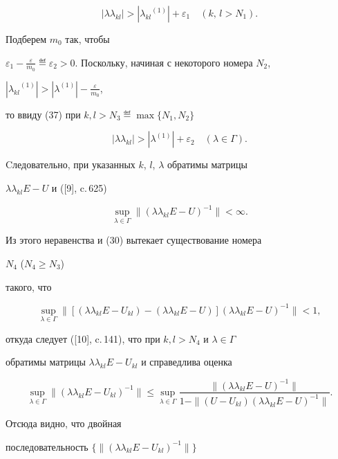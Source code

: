 \begin{pf}
\begin{equation}
|\lambda\lambda_{kl}|>|{\lambda_{kl}}^{(1)}|+{\varepsilon}_1


\quad (k,\,l>N_1).


\end{equation}


Подберем $m_0$ так, чтобы


${\varepsilon}_1-\frac{\varepsilon}{m_0}\eqdef 


{\varepsilon}_2>0$. Поскольку, начиная с некоторого номера $N_2$,


$|{\lambda_{kl}}^{(1)}|>|\lambda^{(1)}|-{\frac{{\varepsilon}}{m_0}}$,


то ввиду (37) при $k,l>N_3\eqdef \max\{N_1,N_2\}$


$$


|\lambda\lambda_{kl}|>|\lambda^{(1)}|+{\varepsilon}_2\quad (\lambda\in\Gamma).


$$


Cледовательно, при указанных $k$, $l$, $\lambda$ обратимы матрицы


$\lambda\lambda_{kl}E-U$ и ([9], c.\,625)


$$


\sup_{\lambda\in\Gamma}\|(\lambda\lambda_{kl}E-U)^{-1}\|<\infty.


$$


Из этого неравенства и (30) вытекает существование номера


$N_4$ ($N_4\ge N_3$)


такого, что


$$


\sup_{\lambda\in\Gamma}\|[(\lambda\lambda_{kl}E-U_{kl})-


(\lambda\lambda_{kl}E-U)](\lambda\lambda_{kl}E-U)^{-1}


\|<1,


$$


откуда следует ([10], c.\,141), что при $k,l>N_4$ и $\lambda\in\Gamma$


обратимы матрицы $\lambda\lambda_{kl}E-U_{kl}$ и справедлива оценка


$$


\sup_{\lambda\in\Gamma}\|(\lambda\lambda_{kl}E-U_{kl})^{-1}\|


\le\sup_{\lambda\in\Gamma}\frac{ \|(\lambda\lambda_{kl}E-U)^{-1}\| }


{ 1-\|(U-U_{kl})(\lambda\lambda_{kl}E-U)^{-1}\|}.


$$


Отсюда видно, что двойная 


последовательность $\{\|(\lambda\lambda_{kl}E-U_{kl})^{-1}\|\}$



\end{pf}
